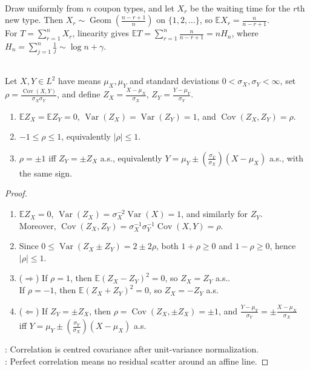 \begin{example} \label{ex:coupon-collector-expectation-harmonic} \\
Draw uniformly from $n$ coupon types, and let $X_r$ be the waiting time for the $r$th new type. Then $X_r\sim\operatorname{Geom}(\frac{n-r+1}{n})$ on $\{1,2,\ldots\}$, so $\mathbb{E}X_r=\frac{n}{n-r+1}$.\\
For $T=\sum\limits_{r=1}^nX_r$, linearity gives $\mathbb{E}T=\sum\limits_{r=1}^n \frac{n}{n-r+1}=nH_n$, where $H_n=\sum\limits_{j=1}^n\frac{1}{j}\sim\log n+\gamma$.
\end{example}

\begin{theorem} \label{thm:correlation-bound-and-equality} \\
Let $X,Y\in L^2$ have means $\mu_X,\mu_Y$ and standard deviations $0<\sigma_X,\sigma_Y<\infty$, set $\rho=\frac{\operatorname{Cov}(X,Y)}{\sigma_X\sigma_Y}$, and define $Z_X=\frac{X-\mu_X}{\sigma_X}$, $Z_Y=\frac{Y-\mu_Y}{\sigma_Y}$.
\begin{enumerate}[label=(\roman*)]
\setlength{\itemsep}{0pt}
\item $\mathbb{E}Z_X=\mathbb{E}Z_Y=0$, $\operatorname{Var}(Z_X)=\operatorname{Var}(Z_Y)=1$, and $\operatorname{Cov}(Z_X,Z_Y)=\rho$.
\item $-1\leq\rho\leq1$, equivalently $|\rho|\leq1$.
\item $\rho=\pm1$ iff $Z_Y=\pm Z_X$ a.s., equivalently $Y=\mu_Y\pm(\frac{\sigma_Y}{\sigma_X})(X-\mu_X)$ a.s., with the same sign.
\end{enumerate}
\begin{proof}
\begin{enumerate}[label=(\roman*)]
\setlength{\itemsep}{0pt}
\item $\mathbb{E}Z_X=0$, $\operatorname{Var}(Z_X)=\sigma_X^{-2}\operatorname{Var}(X)=1$, and similarly for $Z_Y$.\\
Moreover, $\operatorname{Cov}(Z_X,Z_Y)=\sigma_X^{-1}\sigma_Y^{-1}\operatorname{Cov}(X,Y)=\rho$.
\item Since $0\leq\operatorname{Var}(Z_X\pm Z_Y)=2\pm2\rho$, both $1+\rho\geq0$ and $1-\rho\geq0$, hence $|\rho|\leq1$.
\item[$(iii)$]($\Rightarrow$) If $\rho=1$, then $\mathbb{E}(Z_X-Z_Y)^2=0$, so $Z_X=Z_Y$ a.s..\\
If $\rho=-1$, then $\mathbb{E}(Z_X+Z_Y)^2=0$, so $Z_X=-Z_Y$ a.s.
\item[$(iii)$]($\Leftarrow$) If $Z_Y=\pm Z_X$, then $\rho=\operatorname{Cov}(Z_X,\pm Z_X)=\pm1$, and $\frac{Y-\mu_Y}{\sigma_Y}=\pm\frac{X-\mu_X}{\sigma_X}$\\
iff $Y=\mu_Y\pm(\frac{\sigma_Y}{\sigma_X})(X-\mu_X)$ a.s.
\end{enumerate}
: Correlation is centred covariance after unit-variance normalization.\\
: Perfect correlation means no residual scatter around an affine line.
\end{proof}
\end{theorem}

